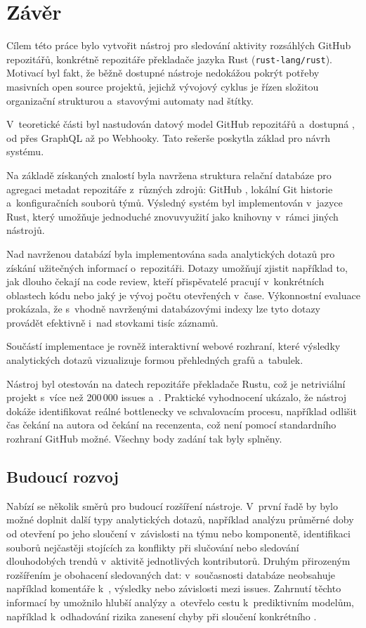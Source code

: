 \chapter{Závěr}
\label{chap:conclusion}

Cílem této práce bylo vytvořit nástroj pro sledování aktivity rozsáhlých GitHub repozitářů, konkrétně repozitáře překladače jazyka Rust (\texttt{rust-lang/rust}).
Motivací byl fakt, že běžně dostupné nástroje nedokážou pokrýt potřeby masivních open source projektů, jejichž vývojový cyklus je řízen složitou organizační strukturou a~stavovými automaty nad štítky.

V~teoretické části byl nastudován datový model GitHub repozitářů a~dostupná \API, od \REST přes GraphQL až po Webhooky.
Tato rešerše poskytla základ pro návrh systému.

Na základě získaných znalostí byla navržena struktura relační databáze pro agregaci metadat repozitáře z~různých zdrojů: GitHub \API, lokální Git historie a~konfiguračních souborů týmů.
Výsledný systém byl implementován v~jazyce Rust, který umožňuje jednoduché znovuvyužití jako knihovny v~rámci jiných nástrojů.

Nad navrženou databází byla implementována sada analytických dotazů pro získání užitečných informací o~repozitáři.
Dotazy umožňují zjistit například to, jak dlouho čekají \PR na code review, kteří přispěvatelé pracují v~konkrétních oblastech kódu nebo jaký je vývoj počtu otevřených \PR v~čase.
Výkonnostní evaluace prokázala, že s~vhodně navrženými databázovými indexy lze tyto dotazy provádět efektivně i~nad stovkami tisíc záznamů.

Součástí implementace je rovněž interaktivní webové rozhraní, které výsledky analytických dotazů vizualizuje formou přehledných grafů a~tabulek.

Nástroj byl otestován na datech repozitáře překladače Rustu, což je netriviální projekt s~více než 200\,000 issues a~\PR.
Praktické vyhodnocení ukázalo, že nástroj dokáže identifikovat reálné bottlenecky ve schvalovacím procesu, například odlišit čas čekání na autora od čekání na recenzenta, což není pomocí standardního rozhraní GitHub možné.
Všechny body zadání tak byly splněny.

\section*{Budoucí rozvoj}
\label{sec:conclusion:rozvoj}

Nabízí se několik směrů pro budoucí rozšíření nástroje.
V~první řadě by bylo možné doplnit další typy analytických dotazů, například analýzu průměrné doby od otevření \PR po jeho sloučení v~závislosti na týmu nebo komponentě, identifikaci souborů nejčastěji stojících za konflikty při slučování nebo sledování dlouhodobých trendů v~aktivitě jednotlivých kontributorů.
Druhým přirozeným rozšířením je obohacení sledovaných dat: v~současnosti databáze neobsahuje například komentáře k~\PR, výsledky \CI nebo závislosti mezi issues.
Zahrnutí těchto informací by umožnilo hlubší analýzy a~otevřelo cestu k~prediktivním modelům, například k~odhadování rizika zanesení chyby při sloučení konkrétního \PR.

